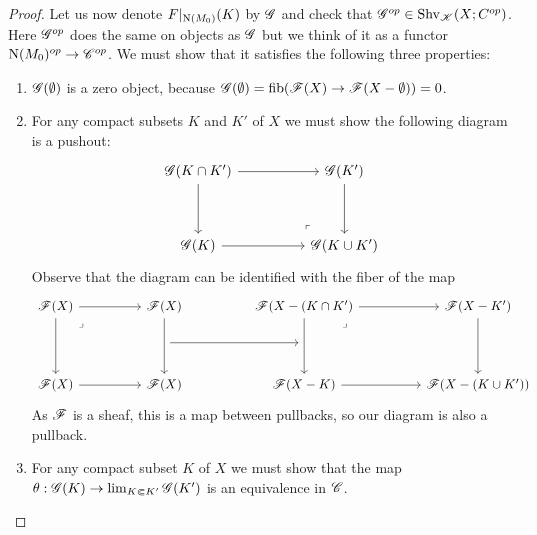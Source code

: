 \documentclass[../../thesis.tex]{subfiles}
\begin{document}
\begin{proof}
    Let us now denote $F|_{\mathrm{N}(M_0)}(K)$ by $\mathscr{G}$ and check that $\mathscr{G}^{op} \in \mathrm{Shv}_{\mathscr{K}}(X;C^{op})$.
    Here $\mathscr{G}^{op}$ does the same on objects as $\mathscr{G}$ but we think of it as a functor $\mathrm{N}(M_0)^{op}\to \mathscr{C}^{op}$.
    We must show that it satisfies the following three properties:
    \begin{enumerate}
        \item $\mathscr{G}(\emptyset)$ is a zero object, because $\mathscr{G}(\emptyset)=\operatorname{fib}(\mathscr{F}(X)\to \mathscr{F}(X-\emptyset))=0$.
        \item For any compact subsets $K$ and $K'$ of $X$ we must show the following diagram is a pushout:
              \[\begin{tikzcd}
                      {\G(K\cap K')} && {\G(K')} \\
                      \\
                      {\G(K)} && {\G(K\cup K')}
                      \arrow[from=1-1, to=3-1]
                      \arrow[from=3-1, to=3-3]
                      \arrow[from=1-1, to=1-3]
                      \arrow[from=1-3, to=3-3]
                      \arrow["\lrcorner"{anchor=center, pos=0.125, rotate=180}, draw=none, from=3-3, to=1-1]
                  \end{tikzcd}\]
              Observe that the diagram can be identified with the fiber of the map
              \[\begin{tikzcd}
                      {\F(X)} && {\F(X)} && {\F(X-(K\cap K')} && {\F(X-K')} \\
                      && {} && {} \\
                      {\F(X)} && {\F(X)} && {\F(X-K)} && {\F(X-(K\cup K'))}
                      \arrow[from=1-5, to=3-5]
                      \arrow[from=3-5, to=3-7]
                      \arrow[from=1-5, to=1-7]
                      \arrow[from=1-7, to=3-7]
                      \arrow["\lrcorner"{anchor=center, pos=0.125}, draw=none, from=1-5, to=3-7]
                      \arrow[from=2-3, to=2-5]
                      \arrow[from=1-3, to=3-3]
                      \arrow[from=1-1, to=1-3]
                      \arrow[from=1-1, to=3-1]
                      \arrow[from=3-1, to=3-3]
                      \arrow["\lrcorner"{anchor=center, pos=0.125}, draw=none, from=1-1, to=3-3]
                  \end{tikzcd}\]
              As $\mathscr{F}$ is a sheaf, this is a map between pullbacks, so our diagram is also a pullback.
        \item For any compact subset $K$ of $X$ we must show that the map $\theta: \mathscr{G}(K)\to \lim_{K\Subset K'}\mathscr{G}(K')$ is an equivalence in $\mathscr{C}$.

\end{enumerate}
\end{proof}
\end{document}

